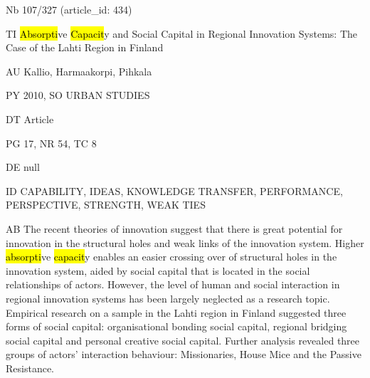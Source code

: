 \documentclass[a4paper]{article}
\begin{document}
\vspace*{-2cm}
Nb \tabto{0cm}107/327 (article\_id: 434)\par
TI \tabto{0cm}\hl{Absorpti}ve \hl{Capacit}y and Social Capital in Regional Innovation Systems: The Case of the Lahti Region in Finland\par
AU \tabto{0cm}Kallio, Harmaakorpi, Pihkala\par
PY \tabto{0cm}2010, SO URBAN STUDIES\par
DT \tabto{0cm}Article\par
PG \tabto{0cm}17, NR 54, TC 8\par
DE \tabto{0cm}null\par
ID \tabto{0cm}CAPABILITY, IDEAS, KNOWLEDGE TRANSFER, PERFORMANCE, PERSPECTIVE, STRENGTH, WEAK TIES\par
AB \tabto{0cm}The recent theories of innovation suggest that there is great potential for innovation in the structural holes and weak links of the innovation system. Higher \hl{absorpti}ve \hl{capacit}y enables an easier crossing over of structural holes in the innovation system, aided by social capital that is located in the social relationships of actors. However, the level of human and social interaction in regional innovation systems has been largely neglected as a research topic. Empirical research on a sample in the Lahti region in Finland suggested three forms of social capital: organisational bonding social capital, regional bridging social capital and personal creative social capital. Further analysis revealed three groups of actors' interaction behaviour: Missionaries, House Mice and the Passive Resistance.\par
\clearpage
\end{document}
